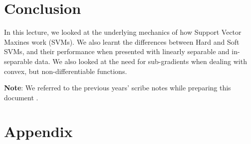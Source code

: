 \documentclass[11pt]{article}
\begin{document}
\section{Conclusion}

In this lecture, we looked at the underlying mechanics of how Support Vector Maxines work (SVMs). We also learnt the differences between Hard and Soft SVMs, and their performance when presented with linearly separable and in-separable data. We also looked at the need for sub-gradients when dealing with convex, but non-differentiable functions.

\textbf{Note}: We referred to the previous years' scribe notes while preparing this document \cite{Paritosh2021}.

\section{Appendix}


{


}


\end{document}
